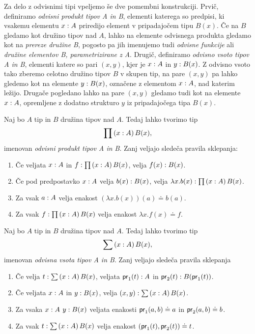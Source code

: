 Za delo z odvisnimi tipi vpeljemo še dve pomembni konstrukciji. Prvič, definiramo
\emph{odvisni produkt tipov A in B}, elementi katerega so predpisi, ki vsakemu elementu
\(x : A\) priredijo element v pripadajočem tipu \(B(x)\).
Če na \(B\) gledamo kot družino tipov
nad \(A\), lahko na elemente odvisnega produkta gledamo kot na \emph{prereze družine B},
pogosto pa jih imenujemo tudi \emph{odvisne funkcije} ali \emph{družine elementov B,
parametrizirane z A}. Drugič, definiramo \emph{odvisno vsoto tipov A in B}, elementi
katere so pari \((x, y)\), kjer je \(x : A\) in \(y : B(x)\).
Z odvisno vsoto tako zberemo celotno družino tipov \(B\) v skupen tip,
na pare \((x, y)\) pa lahko gledemo kot na elemente \(y : B(x)\), označene z
elementom \(x : A\), nad katerim ležijo.
Drugače pogledano lahko na pare \((x, y)\) gledamo tudi kot na elemente
\(x : A\), opremljene z dodatno strukturo \(y\) iz
pripadajočega tipa \(B(x)\).

\begin{definicija}
  Naj bo \(A\) tip in \(B\) družina tipov nad \(A\). Tedaj lahko tvorimo tip
  \[\prod \left( x : A \right) B(x),\] imenovan \emph{odvisni produkt tipov A in B}.
  Zanj veljajo sledeča pravila sklepanja:
  \begin{enumerate}
  \item Če veljata \(x : A\) in
    \(f : \prod \left( x : A \right) B(x)\), velja
    \(f(x) : B(x)\).
  \item Če pod predpostavko \(x : A\) velja \(b(x) : B(x)\),
    velja \(\lambda x.b(x) : \prod \left( x : A \right) B(x)\).
  \item Za vsak \(a : A\) velja enakost \((\lambda x.b(x))(a) \doteq b(a)\).
  \item Za vsak \(f : \prod \left( x : A \right) B(x)\) velja enakost \(\lambda x.f(x) \doteq f\).
  \end{enumerate}
\end{definicija}

\begin{definicija}
  Naj bo \(A\) tip in \(B\) družina tipov nad \(A\). Tedaj lahko tvorimo tip
  \[\sum \left( x : A \right) B(x),\] imenovan \emph{odvisna vsota tipov A in B}.
  Zanj veljajo sledeča pravila sklepanja
  \begin{enumerate}
  \item Če velja \(t : \sum \left( x : A \right) B(x)\), veljata
    \(\textnormal{\textsf{pr}}_{1}(t) : A\) in
    \(\textnormal{\textsf{pr}}_{2}(t) : B(\textnormal{\textsf{pr}}_{1}(t))\).
  \item Če veljata \(x : A\) in \(y : B(x)\), velja
    \((x, y) : \sum \left( x : A \right) B(x)\).
  \item Za vsaka \(x : A\) \(y : B(x)\) veljata enakosti
    \(\textnormal{\textsf{pr}}_{1}(a, b) \doteq a\) in \(\textnormal{\textsf{pr}}_{2}(a, b) \doteq b\).
  \item Za vsak \(t : \sum \left( x : A \right) B(x)\) velja enakost
    \((\textnormal{\textsf{pr}}_{1}(t), \textnormal{\textsf{pr}}_{2}(t)) \doteq t\).
  \end{enumerate}
\end{definicija}

